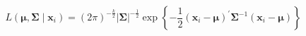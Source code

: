 \begin{equation}
    L
    \left(
    \boldsymbol{\mu},
    \boldsymbol{\Sigma}
    \mid
    \mathbf{x}_{i}
    \right)
    =
    \left(
    2
    \pi
    \right)^{-\frac{k}{2}}
    \left|
    \boldsymbol{\Sigma}
    \right|^{-\frac{1}{2}}
    \exp
    \left\{
    -
    \frac{1}{2}
    \left(
      \mathbf{x}_{i}
      -
      \boldsymbol{\mu}
    \right)^{\prime}
    \boldsymbol{\Sigma}^{-1}
    \left(
      \mathbf{x}_{i}
      -
      \boldsymbol{\mu}
    \right)
    \right\}
    \label{eq:multiNorm-mvn-likelihood-i}
\end{equation}
